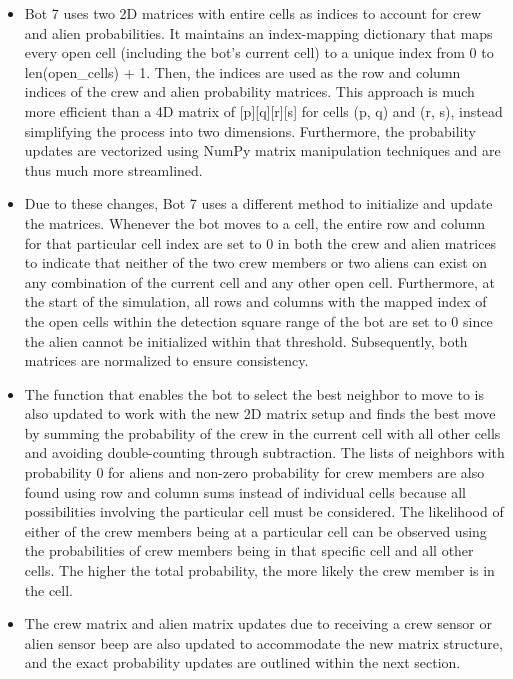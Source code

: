 \documentclass[11pt]{article}
\begin{document}
\begin{itemize}
    \item Bot 7 uses two 2D matrices with entire cells as indices to account for crew and alien probabilities. It maintains an index-mapping dictionary that maps every open cell (including the bot's current cell) to a unique index from 0 to len(open\_cells) + 1. Then, the indices are used as the row and column indices of the crew and alien probability matrices. This approach is much more efficient than a 4D matrix of [p][q][r][s] for cells (p, q) and (r, s), instead simplifying the process into two dimensions. Furthermore, the probability updates are vectorized using NumPy matrix manipulation techniques and are thus much more streamlined.
    \item Due to these changes, Bot 7 uses a different method to initialize and update the matrices. Whenever the bot moves to a cell, the entire row and column for that particular cell index are set to 0 in both the crew and alien matrices to indicate that neither of the two crew members or two aliens can exist on any combination of the current cell and any other open cell. Furthermore, at the start of the simulation, all rows and columns with the mapped index of the open cells within the detection square range of the bot are set to 0 since the alien cannot be initialized within that threshold. Subsequently, both matrices are normalized to ensure consistency.
    \item The function that enables the bot to select the best neighbor to move to is also updated to work with the new 2D matrix setup and finds the best move by summing the probability of the crew in the current cell with all other cells and avoiding double-counting through subtraction. The lists of neighbors with probability 0 for aliens and non-zero probability for crew members are also found using row and column sums instead of individual cells because all possibilities involving the particular cell must be considered. The likelihood of either of the crew members being at a particular cell can be observed using the probabilities of crew members being in that specific cell and all other cells. The higher the total probability, the more likely the crew member is in the cell.
    \item The crew matrix and alien matrix updates due to receiving a crew sensor or alien sensor beep are also updated to accommodate the new matrix structure, and the exact probability updates are outlined within the next section. 
\end{itemize}
\end{document}
